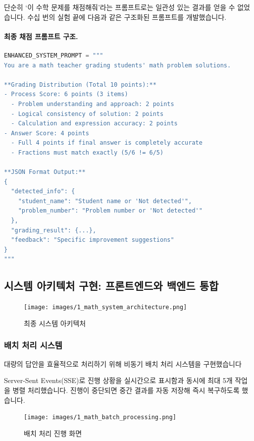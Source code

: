단순히 `이 수학 문제를 채점해줘'라는 프롬프트로는 일관성 있는 결과를 얻을 수 없었습니다. 수십 번의 실험 끝에 다음과 같은 구조화된 프롬프트를 개발했습니다.

\paragraph{최종 채점 프롬프트 구조.}\smallskip
\begin{lstlisting}[language=Python, basicstyle=\footnotesize\ttfamily]
ENHANCED_SYSTEM_PROMPT = """
You are a math teacher grading students' math problem solutions.

**Grading Distribution (Total 10 points):**
- Process Score: 6 points (3 items)
  - Problem understanding and approach: 2 points
  - Logical consistency of solution: 2 points
  - Calculation and expression accuracy: 2 points
- Answer Score: 4 points
  - Full 4 points if final answer is completely accurate
  - Fractions must match exactly (5/6 != 6/5)

**JSON Format Output:** 
{
  "detected_info": {
    "student_name": "Student name or 'Not detected'",
    "problem_number": "Problem number or 'Not detected'"
  },
  "grading_result": {...},
  "feedback": "Specific improvement suggestions"
}
"""
\end{lstlisting}

\subsection{시스템 아키텍처 구현: 프론트엔드와 백엔드 통합}

\begin{figure}[H]
    \centering
    \texttt{[image: images/1\_math\_system\_architecture.png]}
    \caption{최종 시스템 아키텍처}
    \label{fig:math_system_architecture}
\end{figure}

\subsubsection{배치 처리 시스템}

대량의 답안을 효율적으로 처리하기 위해 비동기 배치 처리 시스템을 구현했습니다

Server-Sent Events(SSE)로 진행 상황을 실시간으로 표시함과 동시에 최대 5개 작업을 병렬 처리했습니다. 진행이 중단되면 중간 결과를 자동 저장해 즉시 복구하도록 했습니다.

\begin{figure}[H]
    \centering
    \texttt{[image: images/1\_math\_batch\_processing.png]}
    \caption{배치 처리 진행 화면}
    \label{fig:math_batch_processing}
\end{figure}

